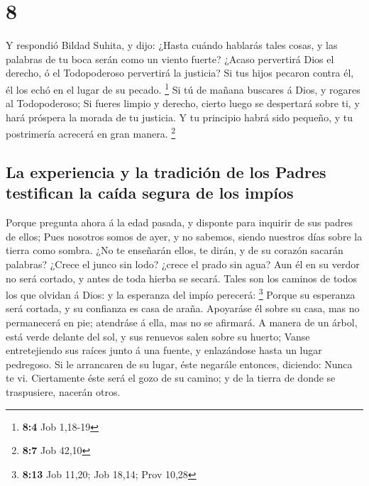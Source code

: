 \hypertarget{section-7}{%
\section{8}\label{section-7}}

 Y respondió Bildad Suhita, y dijo:  ¿Hasta
cuándo hablarás tales cosas, y las palabras de tu boca serán como un
viento fuerte?  ¿Acaso pervertirá Dios el derecho, ó el
Todopoderoso pervertirá la justicia?  Si tus hijos pecaron
contra él, él los echó en el lugar de su pecado. \footnote{\textbf{8:4}
  Job 1,18-19}  Si tú de mañana buscares á Dios, y rogares
al Todopoderoso;  Si fueres limpio y derecho, cierto luego
se despertará sobre ti, y hará próspera la morada de tu justicia.
 Y tu principio habrá sido pequeño, y tu postrimería
acrecerá en gran manera. \footnote{\textbf{8:7} Job 42,10}

\hypertarget{la-experiencia-y-la-tradiciuxf3n-de-los-padres-testifican-la-cauxedda-segura-de-los-impuxedos}{%
\subsection{La experiencia y la tradición de los Padres testifican la
caída segura de los
impíos}\label{la-experiencia-y-la-tradiciuxf3n-de-los-padres-testifican-la-cauxedda-segura-de-los-impuxedos}}

 Porque pregunta ahora á la edad pasada, y disponte para
inquirir de sus padres de ellos;  Pues nosotros somos de
ayer, y no sabemos, siendo nuestros días sobre la tierra como sombra.
 ¿No te enseñarán ellos, te dirán, y de su corazón sacarán
palabras?  ¿Crece el junco sin lodo? ¿crece el prado sin
agua?  Aun él en su verdor no será cortado, y antes de toda
hierba se secará.  Tales son los caminos de todos los que
olvidan á Dios: y la esperanza del impío perecerá: \footnote{\textbf{8:13}
  Job 11,20; Job 18,14; Prov 10,28}  Porque su esperanza
será cortada, y su confianza es casa de araña.  Apoyaráse
él sobre su casa, mas no permanecerá en pie; atendráse á ella, mas no se
afirmará.  A manera de un árbol, está verde delante del
sol, y sus renuevos salen sobre su huerto;  Vanse
entretejiendo sus raíces junto á una fuente, y enlazándose hasta un
lugar pedregoso.  Si le arrancaren de su lugar, éste
negarále entonces, diciendo: Nunca te vi.  Ciertamente éste
será el gozo de su camino; y de la tierra de donde se traspusiere,
nacerán otros.

